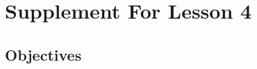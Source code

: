 \documentclass{article}
\begin{document}
\newfontfamily{}
\newfontfamily{}
\newcommand{\bul}{\hfil$\bullet$&}
\renewenvironment{glossary}{\begin{multicols}{5}\begin{center}}{\end{center}\end{multicols}}
\setcounter{secnumdepth}{0}
\setlength{\columnseprule}{1pt}

\section{Supplement For Lesson 4}

\subsection{Objectives}
\end{document}
